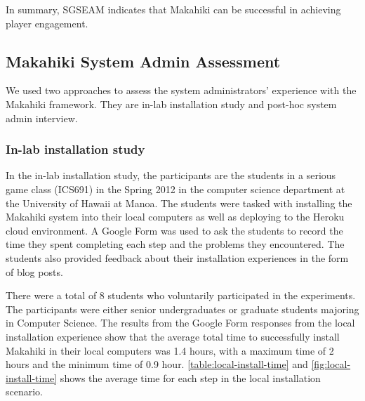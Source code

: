 In summary, SGSEAM indicates that Makahiki can be successful in achieving player engagement.

\subsection{Makahiki System Admin Assessment}
We used two approaches to assess the system administrators' experience with the Makahiki framework. They are in-lab installation study and post-hoc system admin interview.

\subsubsection{In-lab installation study}

In the in-lab installation study, the participants are the students in a serious game class (ICS691) in the Spring 2012 in the computer science department at the University of Hawaii at Manoa. The students were tasked with installing the Makahiki system into their local computers as well as deploying to the Heroku cloud environment. A Google Form was used to ask the students to record the time they spent completing each step and the problems they encountered. The students also provided feedback about their installation experiences in the form of blog posts. 

There were a total of 8 students who voluntarily participated in the experiments.  The participants were either senior undergraduates or graduate students majoring in Computer Science. The results from the Google Form responses from the local installation experience show that the average total time to successfully install Makahiki in their local computers was 1.4 hours, with a maximum time of 2 hours and the minimum time of 0.9 hour.
\autoref{table:local-install-time} and \autoref{fig:local-install-time} shows the average time for each step in the local installation scenario.

